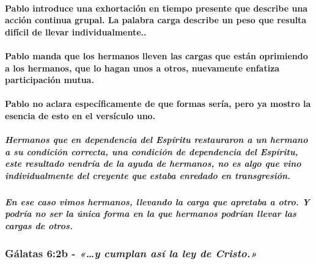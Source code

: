 \documentclass[11a pt,twoside]{article}
\newcommand{\scripture}[1]{%
  {\fontsize{12pt}{16pt}\selectfont\ScriptureFont\itshape #1}%
}
\let\oldsubsubsection\subsubsection
\renewcommand{\subsubsection}{\needspace{4\baselineskip}\oldsubsubsection}
\let\oldparagraph\paragraph
\renewcommand{\paragraph}{\needspace{3\baselineskip}\oldparagraph}
\let\oldsubparagraph\subparagraph
\renewcommand{\subparagraph}{\needspace{2\baselineskip}\oldsubparagraph}
\begin{document}
\paragraph{Pablo introduce una exhortación en tiempo presente que
describe una acción continua grupal. La palabra carga describe un peso
que resulta difícil de llevar
individualmente..}\label{pablo-introduce-una-exhortaciuxf3n-en-tiempo-presente-que-describe-una-acciuxf3n-continua-grupal.-la-palabra-carga-describe-un-peso-que-resulta-difuxedcil-de-llevar-individualmente..}

\paragraph{Pablo manda que los hermanos lleven las cargas que están
oprimiendo a los hermanos, que lo hagan unos a otros, nuevamente
enfatiza participación
mutua.}\label{pablo-manda-que-los-hermanos-lleven-las-cargas-que-estuxe1n-oprimiendo-a-los-hermanos-que-lo-hagan-unos-a-otros-nuevamente-enfatiza-participaciuxf3n-mutua.}

\paragraph{Pablo no aclara específicamente de que formas sería, pero ya
mostro la esencia de esto en el versículo
uno.}\label{pablo-no-aclara-especuxedficamente-de-que-formas-seruxeda-pero-ya-mostro-la-esencia-de-esto-en-el-versuxedculo-uno.}

\subparagraph{Hermanos que en dependencia del Espíritu restauraron a un
hermano a su condición correcta, una condición de dependencia del
Espíritu, este resultado vendría de la ayuda de hermanos, no es algo que
vino individualmente del creyente que estaba enredado en
transgresión.}\label{hermanos-que-en-dependencia-del-espuxedritu-restauraron-a-un-hermano-a-su-condiciuxf3n-correcta-una-condiciuxf3n-de-dependencia-del-espuxedritu-este-resultado-vendruxeda-de-la-ayuda-de-hermanos-no-es-algo-que-vino-individualmente-del-creyente-que-estaba-enredado-en-transgresiuxf3n.}

\subparagraph{En ese caso vimos hermanos, llevando la carga que apretaba
a otro. Y podría no ser la única forma en la que hermanos podrían llevar
las cargas de
otros.}\label{en-ese-caso-vimos-hermanos-llevando-la-carga-que-apretaba-a-otro.-y-podruxeda-no-ser-la-uxfanica-forma-en-la-que-hermanos-podruxedan-llevar-las-cargas-de-otros.}

\subsubsection{\texorpdfstring{Gálatas 6:2b -
\scripture{«…y cumplan así la ley de Cristo.»}}{Gálatas 6:2b - }}\label{guxe1latas-62b---y-cumplan-asuxed-la-ley-de-cristo.}
\end{document}
